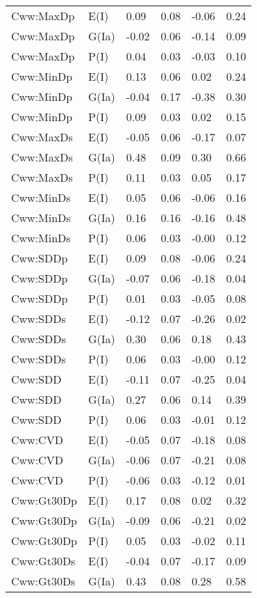 \begin{center}
\begin{longtable}{|p{1.1in}|p{0.7in}|p{0.7in}|p{0.6in}|p{0.6in}|p{0.6in}|}
  Cww:MaxDp & E(I) & 0.09 & 0.08 & -0.06 & 0.24 \\ 
  Cww:MaxDp & G(Ia) & -0.02 & 0.06 & -0.14 & 0.09 \\ 
  Cww:MaxDp & P(I) & 0.04 & 0.03 & -0.03 & 0.10 \\ 
  Cww:MinDp & E(I) & 0.13 & 0.06 & 0.02 & 0.24 \\ 
  Cww:MinDp & G(Ia) & -0.04 & 0.17 & -0.38 & 0.30 \\ 
  Cww:MinDp & P(I) & 0.09 & 0.03 & 0.02 & 0.15 \\ 
  Cww:MaxDs & E(I) & -0.05 & 0.06 & -0.17 & 0.07 \\ 
  Cww:MaxDs & G(Ia) & 0.48 & 0.09 & 0.30 & 0.66 \\ 
  Cww:MaxDs & P(I) & 0.11 & 0.03 & 0.05 & 0.17 \\ 
  Cww:MinDs & E(I) & 0.05 & 0.06 & -0.06 & 0.16 \\ 
  Cww:MinDs & G(Ia) & 0.16 & 0.16 & -0.16 & 0.48 \\ 
  Cww:MinDs & P(I) & 0.06 & 0.03 & -0.00 & 0.12 \\ 
  Cww:SDDp & E(I) & 0.09 & 0.08 & -0.06 & 0.24 \\ 
  Cww:SDDp & G(Ia) & -0.07 & 0.06 & -0.18 & 0.04 \\ 
  Cww:SDDp & P(I) & 0.01 & 0.03 & -0.05 & 0.08 \\ 
  Cww:SDDs & E(I) & -0.12 & 0.07 & -0.26 & 0.02 \\ 
  Cww:SDDs & G(Ia) & 0.30 & 0.06 & 0.18 & 0.43 \\ 
  Cww:SDDs & P(I) & 0.06 & 0.03 & -0.00 & 0.12 \\ 
  Cww:SDD & E(I) & -0.11 & 0.07 & -0.25 & 0.04 \\ 
  Cww:SDD & G(Ia) & 0.27 & 0.06 & 0.14 & 0.39 \\ 
  Cww:SDD & P(I) & 0.06 & 0.03 & -0.01 & 0.12 \\ 
  Cww:CVD & E(I) & -0.05 & 0.07 & -0.18 & 0.08 \\ 
  Cww:CVD & G(Ia) & -0.06 & 0.07 & -0.21 & 0.08 \\ 
  Cww:CVD & P(I) & -0.06 & 0.03 & -0.12 & 0.01 \\ 
  Cww:Gt30Dp & E(I) & 0.17 & 0.08 & 0.02 & 0.32 \\ 
  Cww:Gt30Dp & G(Ia) & -0.09 & 0.06 & -0.21 & 0.02 \\ 
  Cww:Gt30Dp & P(I) & 0.05 & 0.03 & -0.02 & 0.11 \\ 
  Cww:Gt30Ds & E(I) & -0.04 & 0.07 & -0.17 & 0.09 \\ 
  Cww:Gt30Ds & G(Ia) & 0.43 & 0.08 & 0.28 & 0.58 \\ 

\end{longtable}
\end{center}
